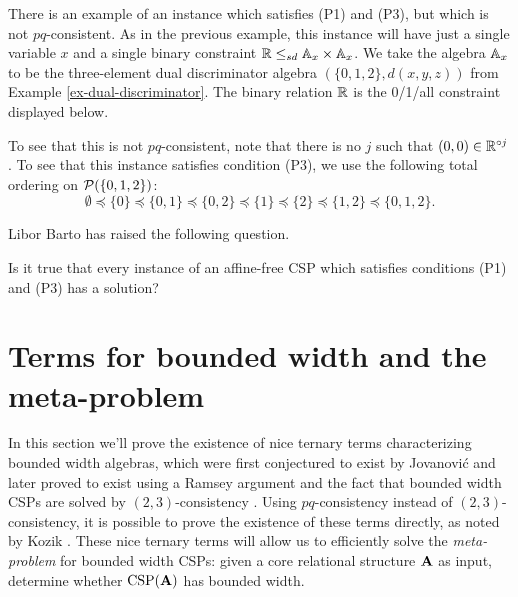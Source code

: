 \documentclass[letterpaper,11pt]{article}
\DeclareMathOperator{\CSP}{CSP}
\begin{document}
\begin{ex} There is an example of an instance which satisfies (P1) and (P3), but which is not $pq$-consistent. As in the previous example, this instance will have just a single variable $x$ and a single binary constraint $\mathbb{R} \le_{sd} \mathbb{A}_x \times \mathbb{A}_x$. We take the algebra $\mathbb{A}_x$ to be the three-element dual discriminator algebra $(\{0,1,2\},d(x,y,z))$ from Example \ref{ex-dual-discriminator}. The binary relation $\mathbb{R}$ is the 0/1/all constraint displayed below.
\begin{center}
\end{center}

To see that this is not $pq$-consistent, note that there is no $j$ such that $(0,0) \in \mathbb{R}^{\circ j}$. To see that this instance satisfies condition (P3), we use the following total ordering on $\mathcal{P}(\{0,1,2\})$:
\[
\emptyset \preceq \{0\} \preceq \{0,1\} \preceq \{0,2\} \preceq \{1\} \preceq \{2\} \preceq \{1,2\} \preceq \{0,1,2\}.
\]
\end{ex}

Libor Barto has raised the following question.

\begin{prob} Is it true that every instance of an affine-free CSP which satisfies conditions (P1) and (P3) has a solution?
\end{prob}


\section{Terms for bounded width and the meta-problem}

In this section we'll prove the existence of nice ternary terms characterizing bounded width algebras, which were first conjectured to exist by Jovanovi\'c \cite{jovanovic-terms} and later proved to exist using a Ramsey argument and the fact that bounded width CSPs are solved by $(2,3)$-consistency \cite{optimal-maltsev}. Using $pq$-consistency instead of $(2,3)$-consistency, it is possible to prove the existence of these terms directly, as noted by Kozik \cite{pq-consistency}. These nice ternary terms will allow us to efficiently solve the \emph{meta-problem} for bounded width CSPs: given a core relational structure $\mathbf{A}$ as input, determine whether $\CSP(\fA)$ has bounded width.
\end{document}

